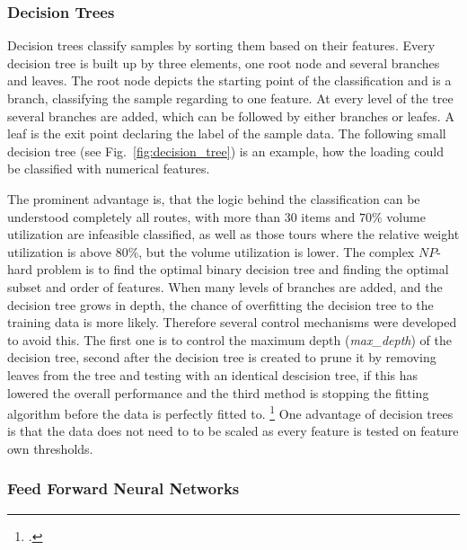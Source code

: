 \subsubsection{Decision Trees}
Decision trees classify samples by sorting them based on their features. Every decision tree
is built up by three elements, one root node and several branches and leaves. The root node
depicts the starting point of the classification and is a branch, classifying the sample
regarding to one feature. At every level of the tree several branches are added, which can be followed
by either branches or leafes. A leaf is the exit point declaring
the label of the sample data. The following small decision tree (see Fig.~\ref{fig:decision_tree}) is an example, how the loading could be classified with numerical features.


The  prominent advantage is, that the logic behind the classification can be understood completely all routes, with more than 30 items and $70\%$ volume utilization are infeasible classified, as well as those tours where the relative weight utilization is above $80\%$, but the volume utilization is lower. The complex
$NP$-hard problem is to find the optimal binary decision tree and finding the optimal subset and order of
features.
When many levels of branches are added, and the decision tree grows in depth, the chance of
overfitting the decision tree to the training data is more likely. Therefore several control mechanisms
were developed to avoid this. The first one is to control the maximum depth (\textit{max\_depth})
of the decision tree, second after the decision tree is created to prune it by removing leaves from
the tree and testing with an identical descision tree, if this has lowered the overall performance
and the third method is stopping the fitting algorithm before the data is perfectly fitted to. \footcite[cf.][p.252]{kotsiantis_supervised_2007}
One advantage of decision trees is that the data does not need to to be scaled as every feature is
tested on feature own thresholds.

\subsubsection{Feed Forward Neural Networks}

